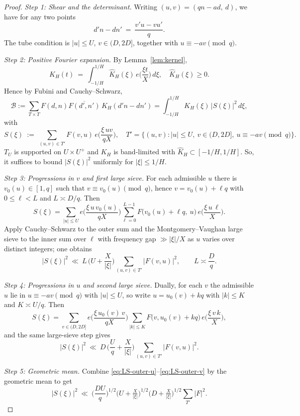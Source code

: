\begin{proof}
\textit{Step 1: Shear and the determinant.}
Writing $(u,v)=(qn-ad,\ d)$, we have for any two points
\[
d'n-dn' \ =\ \frac{v'u - vu'}{q}.
\]
The tube condition is $|u|\le U$, $v\in(D,2D]$, together with $u\equiv -av\pmod q$.

\smallskip
\textit{Step 2: Positive Fourier expansion.}
By Lemma~\ref{lem:kernel},
\[
K_H(t)\ =\ \int_{-1/H}^{1/H}\widehat K_H(\xi)\,e\!\Big(\frac{\xi t}{X}\Big)\,d\xi,
\quad \widehat K_H(\xi)\ge0.
\]
Hence by Fubini and Cauchy--Schwarz,
\[
\mathcal B
:= \sum_{T\times T}\!F(d,n)\overline{F(d',n')}\,K_H(d'n-dn')
= \int_{-1/H}^{1/H}\!\widehat K_H(\xi)\,|S(\xi)|^2\,d\xi,
\]
with
\[
S(\xi) \ :=\ \sum_{(u,v)\in T'} F(v,u)\,e\!\Big(\frac{\xi\,uv}{qX}\Big),
\quad
T'=\{(u,v): |u|\le U,\ v\in(D,2D],\ u\equiv -av\!\!\!\pmod q\}.
\]
\(T_U\) is supported on \(U\times U^+\) and \(K_H\) is band-limited with \(\widehat K_H\subset[-1/H,1/H]\).
So, it suffices to bound $|S(\xi)|^2$ uniformly for $|\xi|\le 1/H$.

\smallskip
\textit{Step 3: Progressions in $v$ and first large sieve.}
For each admissible $u$ there is $v_0(u)\in[1,q]$ such that
$v\equiv v_0(u)\pmod q$, hence $v=v_0(u)+\ell q$ with $0\le \ell<L$ and $L\asymp D/q$.
Then
\[
S(\xi)=\sum_{|u|\le U}\!e\!\Big(\frac{\xi\,u\,v_0(u)}{qX}\Big)
\sum_{\ell=0}^{L-1}\!F\!\big(v_0(u)+\ell q,\ u\big)\,e\!\Big(\frac{\xi\,u\,\ell}{X}\Big).
\]
Apply Cauchy--Schwarz to the outer sum and the Montgomery--Vaughan large sieve to the inner sum
over $\ell$ with frequency gap $\gg |\xi|/X$ as $u$ varies over distinct integers; one obtains
\begin{equation}\label{eq:LS-outer-u}
|S(\xi)|^2\ \ll\ L\,\Big(U+\frac{X}{|\xi|}\Big)\sum_{(u,v)\in T'} |F(v,u)|^2,
\qquad L\asymp \frac{D}{q}.
\end{equation}

\smallskip
\textit{Step 4: Progressions in $u$ and second large sieve.}
Dually, for each $v$ the admissible $u$ lie in $u\equiv -av\pmod q$ with $|u|\le U$,
so write $u=u_0(v)+kq$ with $|k|\le K$ and $K\asymp U/q$. Then
\[
S(\xi)=\sum_{v\in(D,2D]}\!e\!\Big(\frac{\xi\,u_0(v)\,v}{qX}\Big)
\sum_{|k|\le K}\!F\!\big(v, u_0(v)+kq\big)\,e\!\Big(\frac{\xi\,v\,k}{X}\Big),
\]
and the same large-sieve step gives
\begin{equation}\label{eq:LS-outer-v}
|S(\xi)|^2\ \ll\ D\,\Big(\frac{U}{q}+\frac{X}{|\xi|}\Big)\sum_{(u,v)\in T'} |F(v,u)|^2.
\end{equation}

\smallskip
\textit{Step 5: Geometric mean.}
Combine \eqref{eq:LS-outer-u}–\eqref{eq:LS-outer-v} by the geometric mean to get
\[
|S(\xi)|^2 \ \ll\ \Big(\frac{DU}{q}\Big)^{1/2}
\Big(U+\tfrac{X}{|\xi|}\Big)^{1/2}\Big(D+\tfrac{X}{|\xi|}\Big)^{1/2}
\sum_{T'} |F|^2.
\]


\end{proof}

